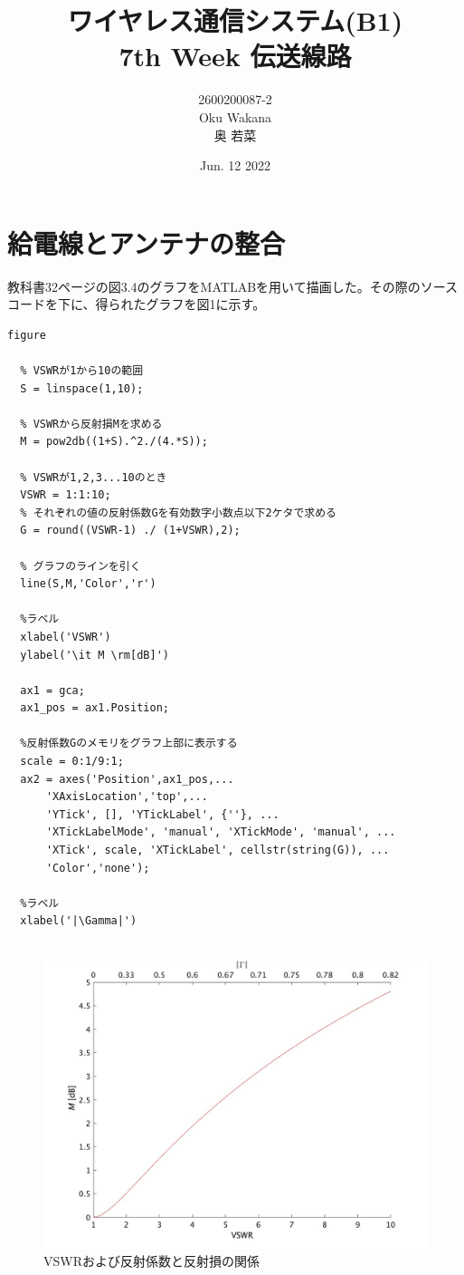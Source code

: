 \documentclass[dvipdfmx,autodetect-engine,titlepage]{jsarticle}
\title{ワイヤレス通信システム(B1)\\
7th Week 伝送線路\\
}
\author{2600200087-2\\Oku Wakana\\奥 若菜}
\date{Jun. 12 2022}
\begin{document}
\maketitle

\section{給電線とアンテナの整合}
教科書32ページの図3.4のグラフをMATLABを用いて描画した。その際のソースコードを下に、得られたグラフを図1に示す。\\

\begin{lstlisting}[caption=ソースコード,label=1]
  figure

  % VSWRが1から10の範囲
  S = linspace(1,10);
  
  % VSWRから反射損Mを求める
  M = pow2db((1+S).^2./(4.*S));
  
  % VSWRが1,2,3...10のとき
  VSWR = 1:1:10;
  % それぞれの値の反射係数Gを有効数字小数点以下2ケタで求める
  G = round((VSWR-1) ./ (1+VSWR),2);
  
  % グラフのラインを引く
  line(S,M,'Color','r')
  
  %ラベル
  xlabel('VSWR')
  ylabel('\it M \rm[dB]')
  
  ax1 = gca; 
  ax1_pos = ax1.Position; 
  
  %反射係数Gのメモリをグラフ上部に表示する
  scale = 0:1/9:1;
  ax2 = axes('Position',ax1_pos,...
      'XAxisLocation','top',...
      'YTick', [], 'YTickLabel', {''}, ...
      'XTickLabelMode', 'manual', 'XTickMode', 'manual', ...  
      'XTick', scale, 'XTickLabel', cellstr(string(G)), ...
      'Color','none');
  
  %ラベル
  xlabel('|\Gamma|')
  
\end{lstlisting}

\begin{figure}[H]
  \centering
  \includegraphics[scale=0.3]{f1.jpg}
  \caption{VSWRおよび反射係数と反射損の関係}\label{fig:図1}
\end{figure}
\end{document}
